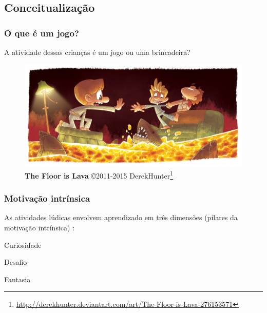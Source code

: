 \expandafter\documentclass\expandafter[table, usenames, svgnames, dvipsnames, \classopts]{beamer}
\begin{document}
\subsection{Conceitualização}

\begin{frame}
	\frametitle{\textbf{O que é um jogo?}}

	\begin{center}
		A atividade dessas crianças é um jogo ou uma brincadeira?
	\end{center}	

	\vspace{-2em}
	
	\begin{figure}
		\centering
		\includegraphics[draft,width=0.9\paperwidth]{floor-is-lava}
		\caption{\textbf{The Floor is Lava} \copyright{2011-2015} DerekHunter\footnote{\url{http://derekhunter.deviantart.com/art/The-Floor-is-Lava-276153571}}}
	\end{figure}
	
	\vspace{2em}

\end{frame}

\begin{frame}
	\frametitle{\textbf{Motivação intrínsica}}

	As atividades lúdicas envolvem aprendizado em três dimensões (pilares da motivação intrínsica) \cite{Malone1980}:

	\vspace{1em}

	\begin{outline}
		\1 Curiosidade
			
		\vspace{1em}
		
		\1 Desafio
					
		\vspace{1em}
		
		\1 Fantasia
	\end{outline}
\end{frame}
\end{document}
